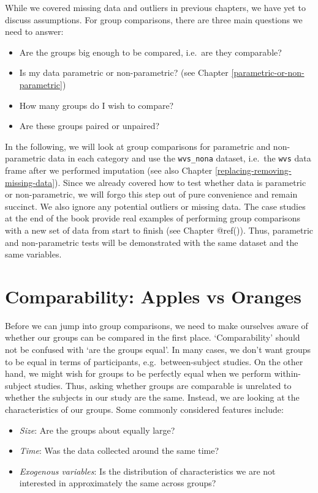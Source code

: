\documentclass[
]{book}
\begin{document}
While we covered missing data and outliers in previous chapters, we have yet to discuss assumptions. For group comparisons, there are three main questions we need to answer:

\begin{itemize}
\item
  Are the groups big enough to be compared, i.e.~are they comparable?
\item
  Is my data parametric or non-parametric? (see Chapter \ref{parametric-or-non-parametric})
\item
  How many groups do I wish to compare?
\item
  Are these groups paired or unpaired?
\end{itemize}

In the following, we will look at group comparisons for parametric and non-parametric data in each category and use the \texttt{wvs\_nona} dataset, i.e.~the \texttt{wvs} data frame after we performed imputation (see also Chapter \ref{replacing-removing-missing-data}). Since we already covered how to test whether data is parametric or non-parametric, we will forgo this step out of pure convenience and remain succinct. We also ignore any potential outliers or missing data. The case studies at the end of the book provide real examples of performing group comparisons with a new set of data from start to finish (see Chapter @ref()). Thus, parametric and non-parametric tests will be demonstrated with the same dataset and the same variables.

\hypertarget{comparability-apples-vs-oranges}{%
\section{Comparability: Apples vs Oranges}\label{comparability-apples-vs-oranges}}

Before we can jump into group comparisons, we need to make ourselves aware of whether our groups can be compared in the first place. `Comparability' should not be confused with `are the groups equal'. In many cases, we don't want groups to be equal in terms of participants, e.g.~between-subject studies. On the other hand, we might wish for groups to be perfectly equal when we perform within-subject studies. Thus, asking whether groups are comparable is unrelated to whether the subjects in our study are the same. Instead, we are looking at the characteristics of our groups. Some commonly considered features include:

\begin{itemize}
\item
  \emph{Size}: Are the groups about equally large?
\item
  \emph{Time}: Was the data collected around the same time?
\item
  \emph{Exogenous variables}: Is the distribution of characteristics we are not interested in approximately the same across groups?
\end{itemize}
\end{document}
